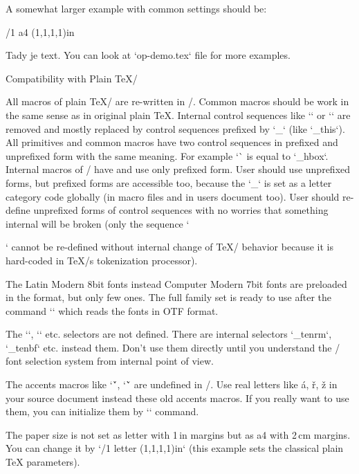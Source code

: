 A somewhat larger example with common settings should be:

\begtt
\fontfam[Termes]   %
\typosize[11/13]   %
\margins/1 a4 (1,1,1,1)in   %
\cslang            %

Tady je text.
\bye
\endtt
%
You can look at `op-demo.tex` file for more examples.


\sec Compatibility with Plain \TeX/

All macros of plain \TeX/ are re-written in \OpTeX/. Common macros should be
work in the same sense as in original plain \TeX. Internal control sequences
\new 
like `\p@` or `\f@@t` are removed and mostly replaced by control sequences
prefixed by `_` (like `\_this`). All primitives and common macros have two
control sequences in prefixed and unprefixed form with the same
meaning. For example `\hbox` is equal to `\_hbox`. 
Internal macros of \OpTeX/ have and use only prefixed form. User should use
unprefixed forms, but prefixed forms are accessible too, because the `_` is
set as a letter category code globally (in macro files and in users document too). User
should re-define unprefixed forms of control sequences with no worries that
something internal will be broken (only the sequence `\par` cannot be
re-defined without internal change of \TeX/ behavior because it is
hard-coded in \TeX/s tokenization processor).

\new
The Latin Modern 8bit fonts instead Computer Modern 7bit fonts are
preloaded in the format, but only few ones. The full family set is ready to
use after the command `\fontfam[LMfonts]` which reads the fonts in OTF
format.

\new
The `\tenrm`, `\tenbf` etc. selectors are not defined. There are internal
selectors `\_tenrm`, `\_tenbf` etc. instead them. Don't use them directly
until you understand the \OpTeX/ font selection system from
internal point of view.

\new
The accents macros like `\'`, `\v` are undefined in \OpTeX/. Use real
letters like á, ř, ž in your source document instead these old accents macros.
If you really want to use them, you can initialize them by `\oldaccents`
command.

\new
The paper size is not set as letter with 1\,in margins but as a4 with 2\,cm
margins. You can change it by `\margins/1 letter (1,1,1,1)in` (this example 
sets the classical plain TeX parameters).

